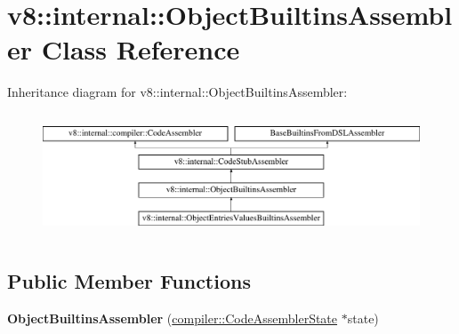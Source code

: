 \hypertarget{classv8_1_1internal_1_1ObjectBuiltinsAssembler}{}\section{v8\+:\+:internal\+:\+:Object\+Builtins\+Assembler Class Reference}
\label{classv8_1_1internal_1_1ObjectBuiltinsAssembler}
Inheritance diagram for v8\+:\+:internal\+:\+:Object\+Builtins\+Assembler\+:\begin{figure}[H]
\begin{center}
\leavevmode
\includegraphics[height=3.708609cm]{classv8_1_1internal_1_1ObjectBuiltinsAssembler}
\end{center}
\end{figure}
\subsection*{Public Member Functions}
\begin{DoxyCompactItemize}
\item 
\mbox{\label{classv8_1_1internal_1_1ObjectBuiltinsAssembler_a0c638c91838a2d185db40cb75079706f}} 
{\bfseries Object\+Builtins\+Assembler} (\mbox{\hyperlink{classv8_1_1internal_1_1compiler_1_1CodeAssemblerState}{compiler\+::\+Code\+Assembler\+State}} $\ast$state)
\end{DoxyCompactItemize}
